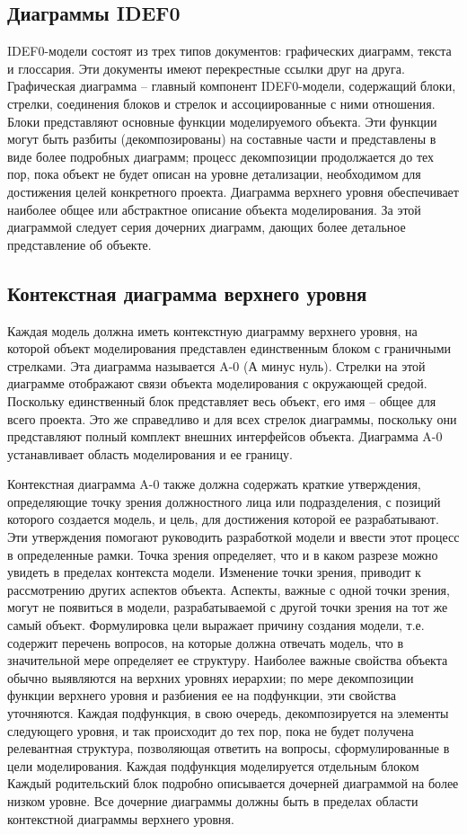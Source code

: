 \documentclass[a4paper, final]{article}
\begin{document}
\subsection{Диаграммы IDEF0}
IDEF0-модели состоят из трех типов документов: графических диаграмм, текста и глоссария. Эти документы имеют перекрестные ссылки друг на
друга. Графическая диаграмма – главный компонент IDEF0-модели, содержащий блоки, стрелки, соединения блоков и стрелок и ассоциированные с
ними отношения. Блоки представляют основные функции моделируемого объекта. Эти функции могут быть разбиты (декомпозированы) на составные
части и представлены в виде более подробных диаграмм; процесс декомпозиции продолжается до тех пор, пока объект не будет описан на уровне детализации, необходимом для достижения целей конкретного проекта. Диаграмма верхнего уровня обеспечивает наиболее общее или абстрактное описание объекта моделирования. За этой диаграммой следует серия дочерних диаграмм, дающих более детальное представление об объекте.

\subsection{Контекстная диаграмма верхнего уровня}
Каждая модель должна иметь контекстную диаграмму верхнего уровня, на которой объект моделирования представлен единственным блоком с граничными стрелками. Эта диаграмма называется A-0 (А минус нуль). Стрелки на этой диаграмме отображают связи объекта моделирования с окружающей средой. Поскольку единственный блок представляет весь объект, его имя -- общее для всего проекта. Это же справедливо и для всех стрелок диаграммы, поскольку они представляют полный комплект внешних интерфейсов объекта. Диаграмма A-0 устанавливает область моделирования и ее границу.

Контекстная диаграмма A-0 также должна содержать краткие утверждения, определяющие точку зрения должностного лица или подразделения, с позиций которого создается модель, и цель, для достижения которой ее разрабатывают. Эти утверждения помогают руководить разработкой модели и ввести этот процесс в определенные рамки. Точка зрения определяет, что и в каком разрезе можно увидеть в пределах контекста модели. Изменение точки зрения, приводит к рассмотрению других аспектов объекта. Аспекты, важные с одной точки зрения, могут не появиться в модели, разрабатываемой с другой точки зрения на тот же самый объект. Формулировка цели выражает причину создания модели, т.е. содержит перечень вопросов, на которые должна отвечать модель, что в значительной мере определяет ее структуру. Наиболее важные свойства объекта обычно выявляются на верхних уровнях иерархии; по мере декомпозиции функции верхнего уровня и разбиения ее на подфункции, эти свойства уточняются. Каждая подфункция, в свою очередь, декомпозируется на элементы следующего уровня, и так происходит до тех пор, пока не будет получена релевантная структура, позволяющая ответить на вопросы, сформулированные в цели моделирования. Каждая подфункция моделируется отдельным блоком Каждый родительский блок подробно описывается дочерней диаграммой на более низком уровне. Все дочерние диаграммы должны быть в пределах области контекстной диаграммы верхнего уровня.
\end{document}
